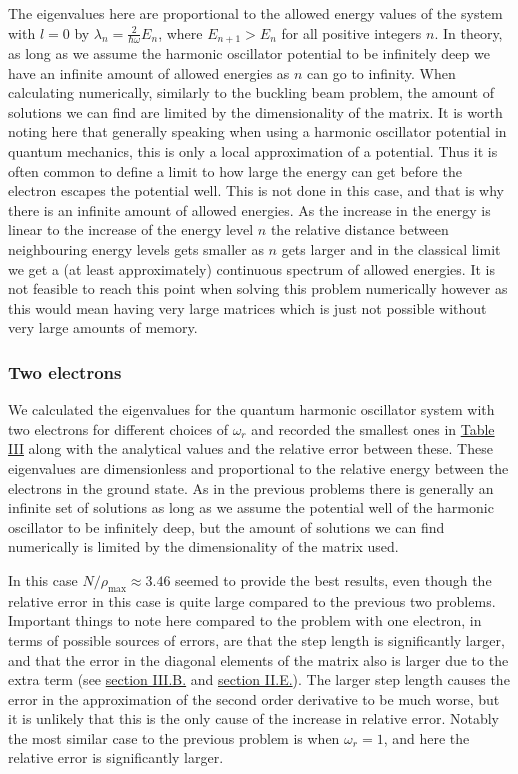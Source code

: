 \documentclass[reprint,english,notitlepage]{revtex4-1}  %
\begin{document}
The eigenvalues here are proportional to the allowed energy values of the system with $l=0$ by $\lambda_n = \frac{2}{\hbar \omega} E_n$, where $E_{n+1} > E_n$ for all positive integers $n$. In theory, as long as we assume the harmonic oscillator potential to be infinitely deep we have an infinite amount of allowed energies as $n$ can go to infinity. When calculating numerically, similarly to the buckling beam problem, the amount of solutions we can find are limited by the dimensionality of the matrix. It is worth noting here that generally speaking when using a harmonic oscillator potential in quantum mechanics, this is only a local approximation of a potential. Thus it is often common to define a limit to how large the energy can get before the electron escapes the potential well. This is not done in this case, and that is why there is an infinite amount of allowed energies. As the increase in the energy is linear to the increase of the energy level $n$ the relative distance between neighbouring energy levels gets smaller as $n$ gets larger and in the classical limit we get a (at least approximately) continuous spectrum of allowed energies. It is not feasible to reach this point when solving this problem numerically however as this would mean having very large matrices which is just not possible without very large amounts of memory.


\subsubsection{Two electrons} \label{sec:V:b:ii}

We calculated the eigenvalues for the quantum harmonic oscillator system with two electrons for different choices of $\omega_r$ and recorded the smallest ones in \hyperref[table:IV:c:1]{Table III} along with the analytical values and the relative error between these. These eigenvalues are dimensionless and proportional to the relative energy between the electrons in the ground state. As in the previous problems there is generally an infinite set of solutions as long as we assume the potential well of the harmonic oscillator to be infinitely deep, but the amount of solutions we can find numerically is limited by the dimensionality of the matrix used.

In this case $N/\rho_\text{max} \approx 3.46$ seemed to provide the best results, even though the relative error in this case is quite large compared to the previous two problems. Important things to note here compared to the problem with one electron, in terms of possible sources of errors, are that the step length is significantly larger, and that the error in the diagonal elements of the matrix also is larger due to the extra term (see \hyperref[sec:III:b]{section III.B.} and \hyperref[sec:II:e]{section II.E.}). The larger step length causes the error in the approximation of the second order derivative to be much worse, but it is unlikely that this is the only cause of the increase in relative error. Notably the most similar case to the previous problem is when $\omega_r = 1$, and here the relative error is significantly larger.
\end{document}
